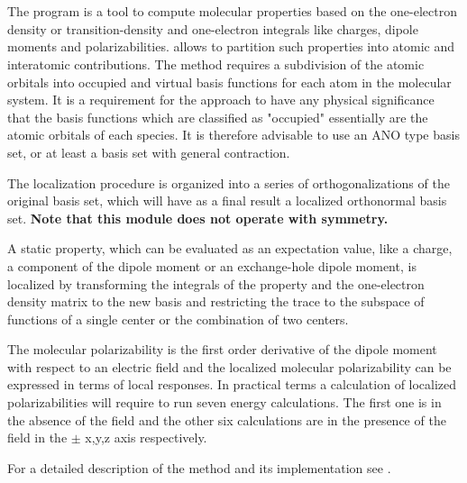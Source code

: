 \section{}
\label{UG:sec:LoProp}

The program
is a tool to compute molecular properties based on the one-electron density
or transition-density and one-electron integrals like charges, dipole moments and polarizabilities.
 allows to partition such properties into atomic and interatomic
contributions. The method requires a subdivision of the atomic orbitals into
occupied and virtual basis functions for each atom in the molecular system.
It is a requirement for the approach to have any physical significance that the
basis functions which are classified as "occupied" essentially are the atomic
orbitals of each species. It is therefore advisable to use an ANO type basis set,
or at least a basis set with general contraction.

The localization procedure is organized into a series of orthogonalizations of
the original basis set, which will have as a final result a localized
orthonormal basis set.
{\bf Note that this module does not operate with symmetry.}

A static property, which can be evaluated as an expectation value, like a charge,
a component of the dipole moment or an exchange-hole dipole moment,
is localized by transforming the integrals
of the property and the one-electron density matrix to the new basis and
restricting the trace to the subspace of functions of a single center or the
combination of two centers.

The molecular polarizability is the first order derivative of the dipole moment
with respect to an electric field and the localized molecular polarizability
can be expressed in terms of local responses. In practical terms a calculation
of localized polarizabilities will require to run seven energy calculations. The
first one is in the absence of the field and the other six calculations are in
the presence of the field in the $\pm$ x,y,z axis respectively.

For a detailed description of the method and its implementation see
\cite{Gagliardi:04a}.

